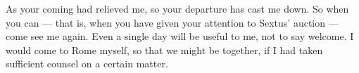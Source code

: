

 As your coming had relieved me, so your departure has cast me down. So when you can --- that is, when you have given your attention to Sextus' auction --- come see me again. Even a single day will be useful to me, not to say welcome. I would come to Rome myself, so that we might be together, if I had taken sufficient counsel on a certain matter.
